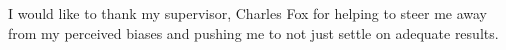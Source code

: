\begin{acknowledgements}


I would like to thank my supervisor, Charles Fox for helping to steer me away from my perceived biases and pushing me to not just settle on adequate results.


\end{acknowledgements}
